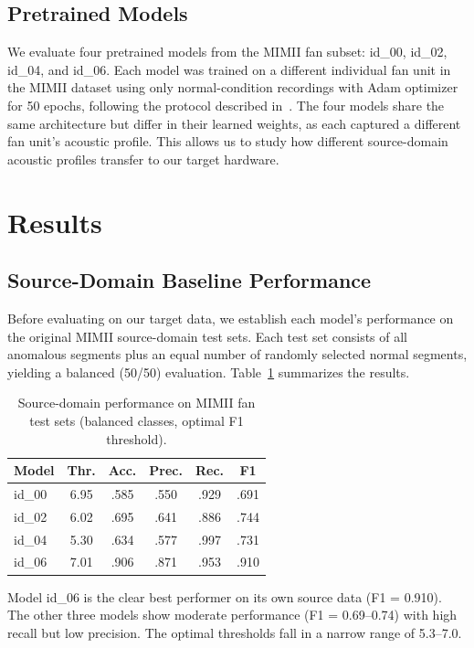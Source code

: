 \documentclass[sigconf]{acmart}
\begin{document}
\subsection{Pretrained Models}

We evaluate four pretrained models from the MIMII fan subset: id\_00, id\_02, id\_04, and id\_06. Each model was trained on a different individual fan unit in the MIMII dataset using only normal-condition recordings with Adam optimizer for 50 epochs, following the protocol described in~\cite{purohit2019mimii}. The four models share the same architecture but differ in their learned weights, as each captured a different fan unit's acoustic profile. This allows us to study how different source-domain acoustic profiles transfer to our target hardware.

\section{Results}

\subsection{Source-Domain Baseline Performance}

Before evaluating on our target data, we establish each model's performance on the original MIMII source-domain test sets. Each test set consists of all anomalous segments plus an equal number of randomly selected normal segments, yielding a balanced (50/50) evaluation. Table~\ref{tab:source} summarizes the results.

\begin{table}[t]
\centering
\caption{Source-domain performance on MIMII fan test sets (balanced classes, optimal F1 threshold).}
\label{tab:source}
\begin{tabular}{l c c c c c}
\toprule
Model & Thr. & Acc. & Prec. & Rec. & F1 \\
\midrule
id\_00 & 6.95 & .585 & .550 & .929 & .691 \\
id\_02 & 6.02 & .695 & .641 & .886 & .744 \\
id\_04 & 5.30 & .634 & .577 & .997 & .731 \\
id\_06 & 7.01 & .906 & .871 & .953 & .910 \\
\bottomrule
\end{tabular}
\end{table}

Model id\_06 is the clear best performer on its own source data (F1 = 0.910). The other three models show moderate performance (F1 = 0.69--0.74) with high recall but low precision. The optimal thresholds fall in a narrow range of 5.3--7.0.
\end{document}
